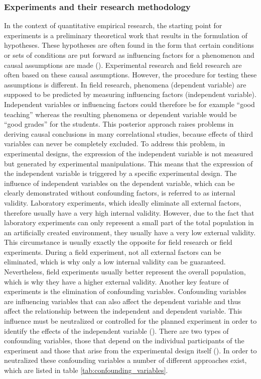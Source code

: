 
\subsubsection{Experiments and their research methodology}


In the context of quantitative empirical research, the starting point for experiments is a preliminary theoretical work that results in the formulation of hypotheses. These hypotheses are often found in the form that certain conditions or sets of conditions are put forward as influencing factors for a phenomenon and causal assumptions are made (\cite{Gniewosz.2011}). Experimental research and field research are often based on these causal assumptions. However, the procedure for testing these assumptions is different. In field research, phenomena (dependent variable) are supposed to be predicted by measuring influencing factors (independent variable). Independent variables or influencing factors could therefore be for example \enquote{good teaching} whereas the resulting phenomena or dependent variable would be \enquote{good grades} for the students. This posterior approach raises problems in deriving causal conclusions in many correlational studies, because effects of third variables can never be completely excluded. To address this problem, in experimental designs, the expression of the independent variable is not measured but generated by experimental manipulations. This means that the expression of the independent variable is triggered by a specific experimental design.
The influence of independent variables on the dependent variable, which can be clearly demonstrated without confounding factors, is referred to as internal validity. Laboratory experiments, which ideally eliminate all external factors, therefore usually have a very high internal validity. However, due to the fact that laboratory experiments can only represent a small part of the total population in an artificially created environment, they usually have a very low external validity. This circumstance is usually exactly the opposite for field research or field experiments. During a field experiment, not all external factors can be eliminated, which is why only a low internal validity can be guaranteed. Nevertheless, field experiments usually better represent the overall population, which is why they have a higher external validity. Another key feature of experiments is the elimination of confounding variables. Confounding variables are influencing variables that can also affect the dependent variable and thus affect the relationship between the independent and dependent variable. This influence must be neutralized or controlled for the planned experiment in order to identify the effects of the independent variable (\cite{Gniewosz.2011}). There are two types of confounding variables, those that depend on the individual participants of the experiment and those that arise from the experimental design itself (\cite{Gniewosz.2011}). In order to neutralized these confounding variables a number of different approaches exist, which are listed in table \ref{tab:confounding_variables}.

